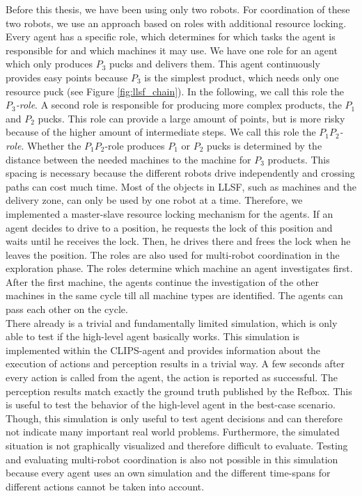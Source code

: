 Before this thesis, we have been using only two robots. For coordination of these two robots, we use an approach based on roles with additional resource locking. Every agent has a specific role, which determines for which tasks the agent is responsible for and which machines it may use. We have one role for an agent which only produces $P_3$ pucks and delivers them. This agent continuously provides easy points because $P_3$ is the simplest product, which needs only one resource puck (see Figure \ref{fig:llsf_chain}). In the following, we call this role the \textit{$P_3$-role}. A second role is responsible for producing  more complex products, the $P_1$ and $P_2$ pucks. This role can provide a large amount of points, but is more risky because of the higher amount of intermediate steps. We call this role the \textit{$P_1P_2$-role}. Whether the $P_1P_2$-role produces $P_1$ or $P_2$ pucks is determined by the distance between the needed machines to the machine for $P_3$ products. This spacing is necessary because the different robots drive independently and crossing paths can cost much time. Most of the objects in LLSF, such as machines and the delivery zone, can only be used by one robot at a time. Therefore, we implemented a master-slave resource locking mechanism for the agents. If an agent decides to drive to a position, he requests the lock of this position and waits until he receives the lock. Then, he drives there and frees the lock when he leaves the position. The roles are also used for multi-robot coordination in the exploration phase. The roles determine which machine an agent investigates first. After the first machine, the agents continue the investigation of the other machines in the same cycle till all machine types are identified. The agents can pass each other on the cycle.\\
There already is a trivial and fundamentally limited simulation, which is only able to test if the high-level agent basically works. This simulation is implemented within the CLIPS-agent and provides information about the execution of actions and perception results in a trivial way. A few seconds after every action is called from the agent, the action is reported as successful. The perception results match exactly the ground truth published by the Refbox. This is useful to test the behavior of the high-level agent in the best-case scenario. Though, this simulation is only useful to test agent decisions and can therefore not indicate many important real world problems. Furthermore, the simulated situation is not graphically visualized and therefore difficult to evaluate. Testing and evaluating multi-robot coordination is also not possible in this simulation because every agent uses an own simulation and the different time-spans for different actions cannot be taken into account.

